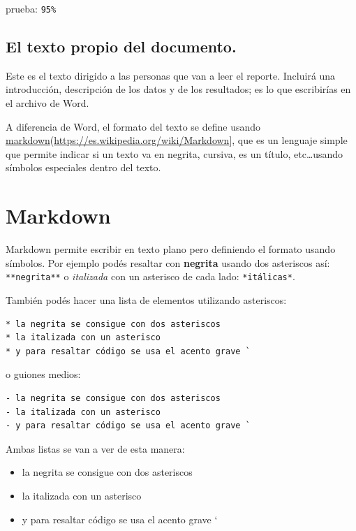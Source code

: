 \documentclass[
  openany]{book}
\providecommand{\tightlist}{%
  \setlength{\itemsep}{0pt}\setlength{\parskip}{0pt}}
\begin{document}
prueba: \texttt{95\%}

\hypertarget{el-texto-propio-del-documento.}{%
\subsection{El texto propio del documento.}\label{el-texto-propio-del-documento.}}

Este es el texto dirigido a las personas que van a leer el reporte.
Incluirá una introducción, descripción de los datos y de los resultados; es lo que escribirías en el archivo de Word.

A diferencia de Word, el formato del texto se define usando \protect\hyperlink{markdown}{markdown}(\url{https://es.wikipedia.org/wiki/Markdown}{]}, que es un lenguaje simple que permite indicar si un texto va en negrita, cursiva, es un título, etc\ldots usando símbolos especiales dentro del texto.

\hypertarget{markdown}{%
\section{Markdown}\label{markdown}}

Markdown permite escribir en texto plano pero definiendo el formato usando símbolos.
Por ejemplo podés resaltar con \textbf{negrita} usando dos asteriscos así: \texttt{**negrita**} o \emph{italizada} con un asterisco de cada lado: \texttt{*itálicas*}.

También podés hacer una lista de elementos utilizando asteriscos:

\begin{verbatim}
* la negrita se consigue con dos asteriscos
* la italizada con un asterisco
* y para resaltar código se usa el acento grave `
\end{verbatim}

o guiones medios:

\begin{verbatim}
- la negrita se consigue con dos asteriscos
- la italizada con un asterisco
- y para resaltar código se usa el acento grave `
\end{verbatim}

Ambas listas se van a ver de esta manera:

\begin{itemize}
\tightlist
\item
  la negrita se consigue con dos asteriscos
\item
  la italizada con un asterisco
\item
  y para resaltar código se usa el acento grave `
\end{itemize}
\end{document}
